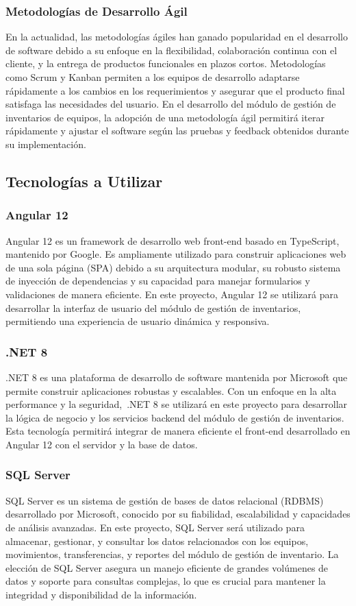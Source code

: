 \documentclass[stu, 12pt, letterpaper, donotrepeattitle, floatsintext, natbib]{apa7}
\begin{document}
\subsubsection{Metodologías de Desarrollo Ágil}
En la actualidad, las metodologías ágiles han ganado popularidad en el desarrollo de software debido a su enfoque en la flexibilidad,
colaboración continua con el cliente, y la entrega de productos funcionales en plazos cortos. Metodologías como Scrum y Kanban permiten a los
equipos de desarrollo adaptarse rápidamente a los cambios en los requerimientos y asegurar que el producto final satisfaga las necesidades del
usuario. En el desarrollo del módulo de gestión de inventarios de equipos, la adopción de una metodología ágil permitirá iterar rápidamente y
ajustar el software según las pruebas y feedback obtenidos durante su implementación.
\subsection{Tecnologías a Utilizar}
\subsubsection{Angular 12}
Angular 12 es un framework de desarrollo web front-end basado en TypeScript, mantenido por Google. Es ampliamente utilizado para construir
aplicaciones web de una sola página (SPA) debido a su arquitectura modular, su robusto sistema de inyección de dependencias y su capacidad para
manejar formularios y validaciones de manera eficiente. En este proyecto, Angular 12 se utilizará para desarrollar la interfaz de usuario del
módulo de gestión de inventarios, permitiendo una experiencia de usuario dinámica y responsiva.
\subsubsection{.NET 8}
.NET 8 es una plataforma de desarrollo de software mantenida por Microsoft que permite construir aplicaciones robustas y escalables. Con un
enfoque en la alta performance y la seguridad,~.NET 8 se utilizará en este proyecto para desarrollar la lógica de negocio y los servicios
backend del módulo de gestión de inventarios. Esta tecnología permitirá integrar de manera eficiente el front-end desarrollado en Angular 12
con el servidor y la base de datos.
\subsubsection{SQL Server}
SQL Server es un sistema de gestión de bases de datos relacional (RDBMS) desarrollado por Microsoft, conocido por su fiabilidad, escalabilidad
y capacidades de análisis avanzadas. En este proyecto, SQL Server será utilizado para almacenar, gestionar, y consultar los datos relacionados
con los equipos, movimientos, transferencias, y reportes del módulo de gestión de inventario. La elección de SQL Server asegura un manejo
eficiente de grandes volúmenes de datos y soporte para consultas complejas, lo que es crucial para mantener la integridad y disponibilidad de
la información.
\end{document}
